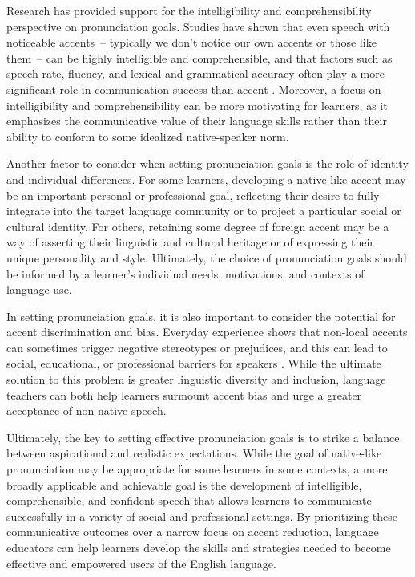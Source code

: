 Research has provided support for the intelligibility and comprehensibility perspective on pronunciation goals. Studies have shown that even speech with noticeable accents~-- typically we don't notice our own accents or those like them~-- can be highly intelligible and comprehensible, and that factors such as speech rate, fluency, and lexical and grammatical accuracy often play a more significant role in communication success than accent \citep{MunroDerwing1995}. Moreover, a focus on intelligibility and comprehensibility can be more motivating for learners, as it emphasizes the communicative value of their language skills rather than their ability to conform to some idealized native-speaker norm.

Another factor to consider when setting pronunciation goals is the role of identity and individual differences. For some learners, developing a native-like accent may be an important personal or professional goal, reflecting their desire to fully integrate into the target language community or to project a particular social or cultural identity. For others, retaining some degree of foreign accent may be a way of asserting their linguistic and cultural heritage or of expressing their unique personality and style. Ultimately, the choice of pronunciation goals should be informed by a learner's individual needs, motivations, and contexts of language use.

In setting pronunciation goals, it is also important to consider the potential for accent discrimination and bias. Everyday experience shows that non-local accents can sometimes trigger negative stereotypes or prejudices, and this can lead to social, educational, or professional barriers for speakers \citep{LippiGreen2012accent}. While the ultimate solution to this problem is greater linguistic diversity and inclusion, language teachers can both help learners surmount accent bias and urge a greater acceptance of non-native speech.

Ultimately, the key to setting effective pronunciation goals is to strike a balance between aspirational and realistic expectations. While the goal of native-like pronunciation may be appropriate for some learners in some contexts, a more broadly applicable and achievable goal is the development of intelligible, comprehensible, and confident speech that allows learners to communicate successfully in a variety of social and professional settings. By prioritizing these communicative outcomes over a narrow focus on accent reduction, language educators can help learners develop the skills and strategies needed to become effective and empowered users of the English language.

